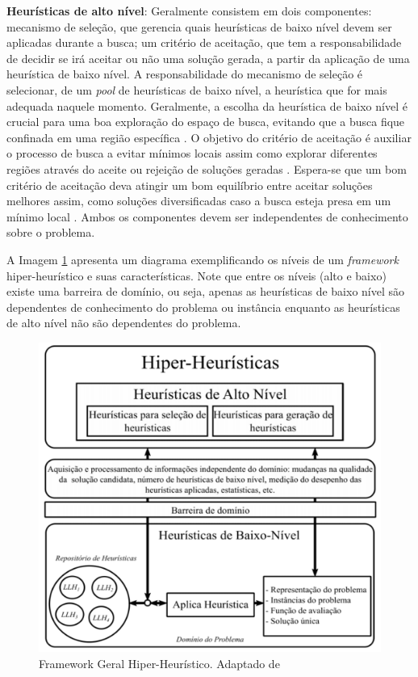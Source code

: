 \textbf{Heurísticas de alto nível}: Geralmente consistem em dois componentes: mecanismo de seleção, que gerencia quais heurísticas de baixo nível devem ser aplicadas durante a busca; um critério de aceitação, que tem a responsabilidade de decidir se irá aceitar ou não uma solução gerada, a partir da aplicação de uma heurística de baixo nível. A responsabilidade do mecanismo de seleção é selecionar, de um \textit{pool} de heurísticas de baixo nível, a heurística que for mais adequada naquele momento. Geralmente, a escolha da heurística de baixo nível é crucial para uma boa exploração do espaço de busca, evitando que a busca fique confinada em uma região específica \cite{sabar2015automatic}. O objetivo do critério de aceitação é auxiliar o processo de busca a evitar mínimos locais assim como explorar diferentes regiões através do aceite ou rejeição de soluções geradas \cite{chakhlevitch2008hyperheuristics}. Espera-se que um bom critério de aceitação deva atingir um bom equilíbrio entre aceitar soluções melhores assim, como soluções diversificadas caso a busca esteja presa em um mínimo local \cite{sabar2015automatic}. Ambos os componentes devem ser independentes de conhecimento sobre o problema.

A Imagem \ref{img:hiperheuristico} apresenta um diagrama exemplificando os níveis de um \textit{framework} hiper-heurístico e suas características. Note que entre os níveis (alto e baixo) existe uma barreira de domínio, ou seja, apenas as heurísticas de baixo nível são dependentes de conhecimento do problema ou instância enquanto as heurísticas de alto nível não são dependentes do problema. 

\begin{figure}[!htb]
	\centering
	\includegraphics{Imagens/HiperHeuristicas.png}
	\caption{Framework Geral Hiper-Heurístico. Adaptado de \cite{sabar2015automatic}}
	\label{img:hiperheuristico}
\end{figure}


